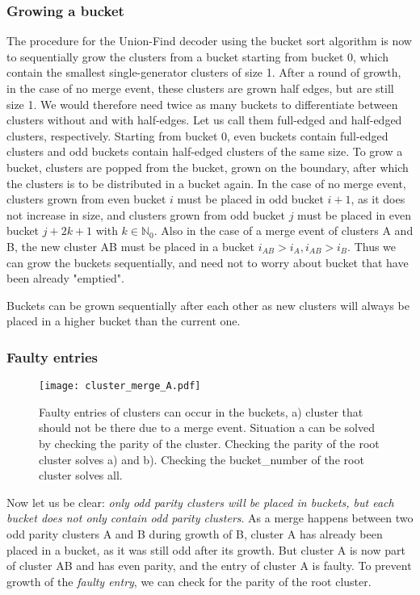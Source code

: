 \subsubsection{Growing a bucket}
The procedure for the Union-Find decoder using the bucket sort algorithm is now to sequentially grow the clusters from a bucket starting from bucket 0, which contain the smallest single-generator clusters of size 1. After a round of growth, in the case of no merge event, these clusters are grown half edges, but are still size 1. We would therefore need twice as many buckets to differentiate between clusters without and with half-edges. Let us call them full-edged and half-edged clusters, respectively. Starting from bucket 0, even buckets contain full-edged clusters and odd buckets contain half-edged clusters of the same size. To grow a bucket, clusters are popped from the bucket, grown on the boundary, after which the clusters is to be distributed in a bucket again. In the case of no merge event, clusters grown from even bucket $i$ must be placed in odd bucket $i + 1$, as it does not increase in size, and clusters grown from odd bucket $j$ must be placed in even bucket $j + 2k + 1$ with $k \in \mathbb{N}_0$. Also in the case of a merge event of clusters A and B, the new cluster AB must be placed in a bucket $i_{AB} > i_A, i_{AB} > i_B$. Thus we can grow the buckets sequentially, and need not to worry about bucket that have been already "emptied".
\begin{lemma}
  Buckets can be grown sequentially after each other as new clusters will always be placed in a higher bucket than the current one.
\end{lemma}

\subsubsection{Faulty entries}

\begin{figure}
  \centering
  \texttt{[image: cluster\_merge\_A.pdf]}
  \caption{Faulty entries of clusters can occur in the buckets, a) cluster that should not be there due to a merge event. Situation a can be solved by checking the parity of the cluster. Checking the parity of the root cluster solves a) and b). Checking the bucket\_number of the root cluster solves all.}\label{3.fig.clustermergeB}
\end{figure}

Now let us be clear: \emph{only odd parity clusters will be placed in buckets, but each bucket does not only contain odd parity clusters}. As a merge happens between two odd parity clusters A and B during growth of B, cluster A has already been placed in a bucket, as it was still odd after its growth. But cluster A is now part of cluster AB and has even parity, and the entry of cluster A is faulty. To prevent growth of the \emph{faulty entry}, we can check for the parity of the root cluster.

